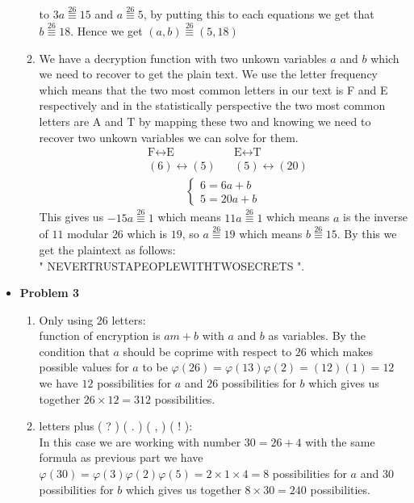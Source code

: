 \documentclass{article}
\newcommand{\ev}[1]{\stackrel{#1}{\equiv}}
\begin{document}
\begin{itemize}
\begin{enumerate}[label=(\alph*)]
			to $3a \ev{26} 15$ and $a \ev{26} 5$, by putting this to each equations we get that $b \ev{26} 18$.
			Hence we get $(a,b) \ev{26} (5, 18)$
			\item
				We have a decryption function with two unkown variables $a$ and $b$ which we need to recover to get the plain text.
				We use the letter frequency which means that the two most common letters in our text is F and E respectively and in the
				statistically perspective the two most common letters are A and T by mapping these two and knowing we need to recover two
				unkown variables we can solve for them.
				\begin{align*}
					&\text{F} \longleftrightarrow \text{E} &&\text{E} \longleftrightarrow \text{T}\\
					& (6) \longleftrightarrow  (5)  && (5) \longleftrightarrow  (20) 
				\end{align*}
				\begin{align*}
					\left\{ \begin{array}{ll}
							6 = 6a + b\\ 5 = 20a + b
						\end{array}\right.
				\end{align*}
				This gives us $-15a \ev{26} 1$ which means $11a \ev{26} 1$ which means $a$ is the inverse of $11$ modular $26$
				which is $19$, so $a \ev{26} 19$ which means $b \ev{26} 15$. By this we get the plaintext as follows:\\
				" NEVERTRUSTAPEOPLEWITHTWOSECRETS ".
		\end{enumerate}
	\item{\textcolor{for}{\textbf{Problem 3}}}
		\begin{enumerate}[label=(\roman*)]
			\item Only using 26 letters:\\
				function of encryption is $am+b$ with $a$ and $b$ as variables. By the condition that $a$ should be coprime with respect to
				$26$ which makes possible values for $a$ to be $\varphi(26)=\varphi(13)\varphi(2) = (12)(1) = 12$ we have $12$ possibilities
				for $a$ and $26$ possibilities for $b$ which gives us together $26 \times 12=312$ possibilities.
			\item letters plus ( ? ) ( . ) ( , ) ( ! ):\\
				In this case we are working with number $30 = 26 + 4$ with the same formula as previous part we have
				$\varphi(30) = \varphi(3)\varphi(2)\varphi(5) = 2 \times 1 \times 4 = 8$ possibilities for $a$ and $30$ possibilities for
				$b$ which gives us together $8 \times 30 = 240$ possibilities.

\end{enumerate}
\end{itemize}
\end{document}
